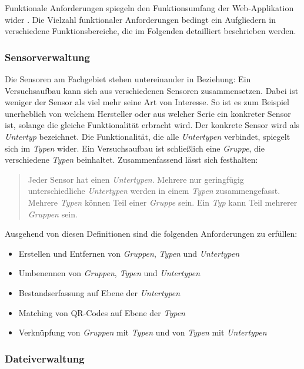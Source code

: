 \documentclass[
]{article}
\providecommand{\tightlist}{%
  \setlength{\itemsep}{0pt}\setlength{\parskip}{0pt}}
\begin{document}
Funktionale Anforderungen spiegeln den Funktionsumfang der Web-Applikation wider \autocite[S.42]{Fuchs2002}. Die Vielzahl funktionaler Anforderungen bedingt ein Aufgliedern in verschiedene Funktionsbereiche, die im Folgenden detailliert beschrieben werden.

\hypertarget{sensorverwaltung}{%
\subsubsection{Sensorverwaltung}\label{sensorverwaltung}}

Die Sensoren am Fachgebiet stehen untereinander in Beziehung: Ein Versuchsaufbau kann sich aus verschiedenen Sensoren zusammensetzen. Dabei ist weniger der Sensor als viel mehr seine Art von Interesse. So ist es zum Beispiel unerheblich von welchem Hersteller oder aus welcher Serie ein konkreter Sensor ist, solange die gleiche Funktionalität erbracht wird. Der konkrete Sensor wird als \emph{Untertyp} bezeichnet. Die Funktionalität, die alle \emph{Untertypen} verbindet, spiegelt sich im \emph{Typen} wider. Ein Versuchsaufbau ist schließlich eine \emph{Gruppe}, die verschiedene \emph{Typen} beinhaltet. Zusammenfassend lässt sich festhalten:

\begin{quote}
Jeder Sensor hat einen \emph{Untertypen}. Mehrere nur geringfügig unterschiedliche \emph{Untertypen} werden in einem \emph{Typen} zusammengefasst. Mehrere \emph{Typen} können Teil einer \emph{Gruppe} sein. Ein \emph{Typ} kann Teil mehrerer \emph{Gruppen} sein.
\end{quote}

Ausgehend von diesen Definitionen sind die folgenden Anforderungen zu erfüllen:

\begin{itemize}
\tightlist
\item
  Erstellen und Entfernen von \emph{Gruppen}, \emph{Typen} und \emph{Untertypen}
\item
  Umbenennen von \emph{Gruppen}, \emph{Typen} und \emph{Untertypen}
\item
  Bestandserfassung auf Ebene der \emph{Untertypen}
\item
  Matching von QR-Codes auf Ebene der \emph{Typen}
\item
  Verknüpfung von \emph{Gruppen} mit \emph{Typen} und von \emph{Typen} mit \emph{Untertypen}
\end{itemize}

\hypertarget{dateiverwaltung}{%
\subsubsection{Dateiverwaltung}\label{dateiverwaltung}}
\end{document}
